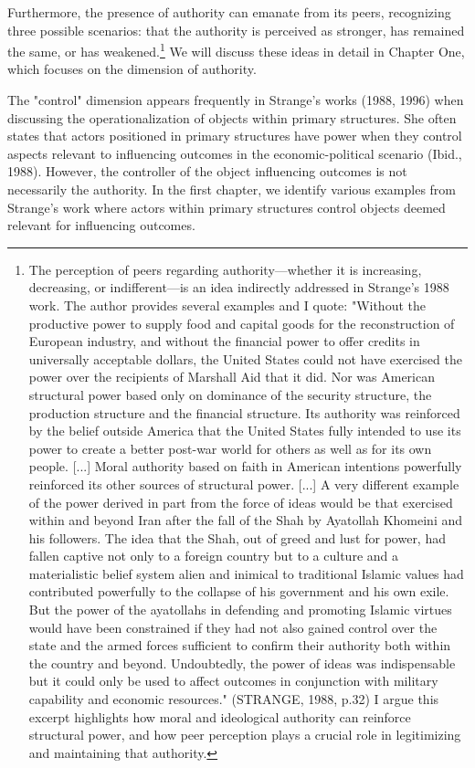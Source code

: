 Furthermore, the presence of authority can emanate from its peers, recognizing three possible scenarios: that the authority is perceived as stronger, has remained the same, or has weakened.\footnote{The perception of peers regarding authority—whether it is increasing, decreasing, or indifferent—is an idea indirectly addressed in Strange's 1988 work. The author provides several examples and I quote: "Without the productive power to supply food and capital goods for the reconstruction of European industry, and without the financial power to offer credits in universally acceptable dollars, the United States could not have exercised the power over the recipients of Marshall Aid that it did. Nor was American structural power based only on dominance of the security structure, the production structure and the financial structure. Its authority was reinforced by the belief outside America that the United States fully intended to use its power to create a better post-war world for others as well as for its own people. [...] Moral authority based on faith in American intentions powerfully reinforced its other sources of structural power. [...] A very different example of the power derived in part from the force of ideas would be that exercised within and beyond Iran after the fall of the Shah by Ayatollah Khomeini and his followers. The idea that the Shah, out of greed and lust for power, had fallen captive not only to a foreign country but to a culture and a materialistic belief system alien and inimical to traditional Islamic values had contributed powerfully to the collapse of his government and his own exile. But the power of the ayatollahs in defending and promoting Islamic virtues would have been constrained if they had not also gained control over the state and the armed forces sufficient to confirm their authority both within the country and beyond. Undoubtedly, the power of ideas was indispensable but it could only be used to affect outcomes in conjunction with military capability and economic resources." (STRANGE, 1988, p.32) I argue this excerpt highlights how moral and ideological authority can reinforce structural power, and how peer perception plays a crucial role in legitimizing and maintaining that authority.} We will discuss these ideas in detail in Chapter One, which focuses on the dimension of authority.

The "control" dimension appears frequently in Strange's works (1988, 1996) when discussing the operationalization of objects within primary structures. She often states that actors positioned in primary structures have power when they control aspects relevant to influencing outcomes in the economic-political scenario (Ibid., 1988). However, the controller of the object influencing outcomes is not necessarily the authority. In the first chapter, we identify various examples from Strange's work where actors within primary structures control objects deemed relevant for influencing outcomes.


